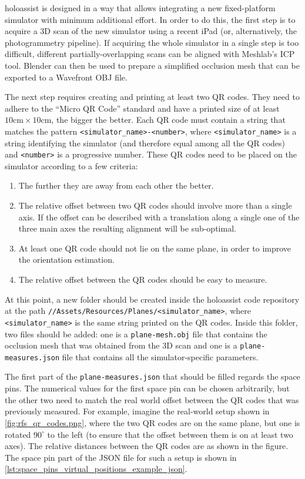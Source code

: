 \gls{holoassist} is designed in a way that allows integrating a new fixed-platform simulator with minimum additional effort. In order to do this, the first step is to acquire a 3D scan of the new simulator using a recent iPad\cite{apple_inc_ipad_nodate} (or, alternatively, the photogrammetry pipeline). If acquiring the whole simulator in a single step is too difficult, different partially-overlapping scans can be aligned with Meshlab's ICP tool\cite{zhang_fast_2021}. Blender can then be used to prepare a simplified occlusion mesh that can be exported to a Wavefront OBJ file.

The next step requires creating and printing at least two QR codes. They need to adhere to the \enquote{Micro QR Code}\cite{japan_industrial_standards_microqr_nodate} standard and have a printed size of at least $10\text{cm} \times 10\text{cm}$, the bigger the better. Each QR code must contain a string that matches the pattern \texttt{<simulator\_name>\--<number>}, where \texttt{<simulator\_name>} is a string identifying the simulator (and therefore equal among all the QR codes) and \texttt{<number>} is a progressive number. These QR codes need to be placed on the simulator according to a few criteria:

\begin{enumerate}
    \item The further they are away from each other the better.
    \item The relative offset between two QR codes should involve more than a single axis. If the offset can be described with a translation along a single one of the three main axes the resulting alignment will be sub-optimal.
    \item At least one QR code should not lie on the same plane, in order to improve the orientation estimation.
    \item The relative offset between the QR codes should be easy to measure.
\end{enumerate}

At this point, a new folder should be created inside the \gls{holoassist} code repository at the path \texttt{//Assets/Resources/Planes/<simulator\_name>}, where \texttt{<simulator\_name>} is the same string printed on the QR codes. Inside this folder, two files should be added: one is a \texttt{plane-mesh.obj} file that contains the occlusion mesh that was obtained from the 3D scan and one is a \texttt{plane-measures.json} file that contains all the simulator-specific parameters.

The first part of the \texttt{plane-measures.json} that should be filled regards the space pins. The numerical values for the first space pin can be chosen arbitrarily, but the other two need to match the real world offset between the QR codes that was previously measured. For example, imagine the real-world setup shown in \autoref{fig:rfs_qr_codes.png}, where the two QR codes are on the same plane, but one is rotated $90^{\circ}$ to the left (to ensure that the offset between them is on at least two axes). The relative distances between the QR codes are as shown in the figure. The space pin part of the JSON file for such a setup is shown in \autoref{lst:space_pins_virtual_positions_example_json}.

